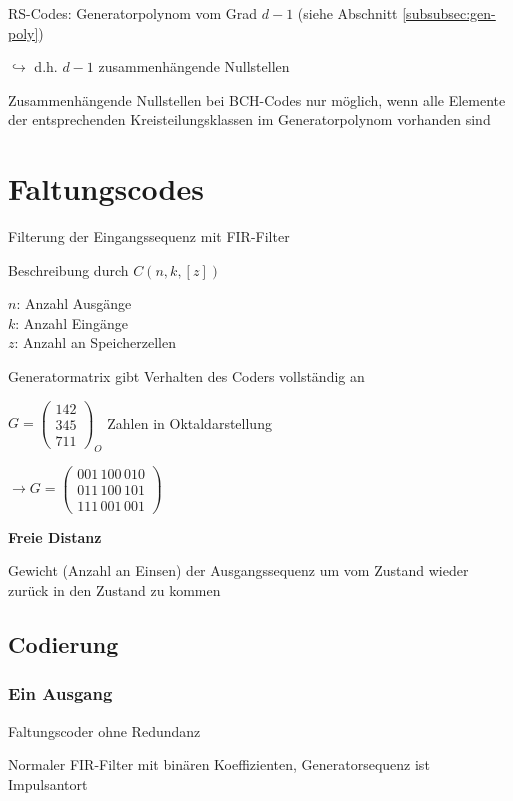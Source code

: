 RS-Codes: Generatorpolynom vom Grad $d-1$ (siehe Abschnitt \ref{subsubsec:gen-poly})

$\hookrightarrow$ d.h. $d-1$ zusammenhängende Nullstellen

Zusammenhängende Nullstellen bei BCH-Codes nur möglich, wenn alle Elemente der entsprechenden
Kreisteilungsklassen im Generatorpolynom vorhanden sind

\section{Faltungscodes}

Filterung der Eingangssequenz mit FIR-Filter

Beschreibung durch $C(n, k, [z])$

$n$: Anzahl Ausgänge\\
$k$: Anzahl Eingänge\\
$z$: Anzahl an Speicherzellen

Generatormatrix gibt Verhalten des Coders vollständig an

$\displaystyle{
    G = \begin{pmatrix}
        142\\
        345\\
        711
    \end{pmatrix}_O
}$ \;\;\;\;\;\; Zahlen in Oktaldarstellung

$\displaystyle{
    \rightarrow G = \begin{pmatrix}
        001\,100\,010\\
        011\,100\,101\\
        111\,001\,001
    \end{pmatrix}
}$

\textbf{Freie Distanz}

Gewicht (Anzahl an Einsen) der Ausgangssequenz um vom Zustand \flqq{} wieder zurück in den Zustand \flqq{}
zu kommen

\subsection{Codierung}

\subsubsection{Ein Ausgang}

Faltungscoder ohne Redundanz

Normaler FIR-Filter mit binären Koeffizienten, Generatorsequenz ist Impulsantort

